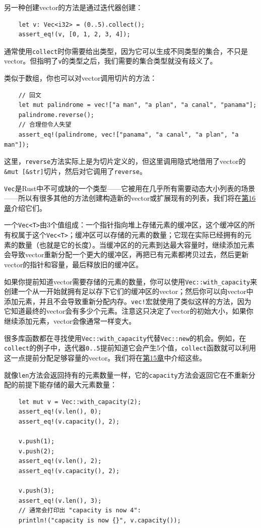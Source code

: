 另一种创建vector的方法是通过迭代器创建：
\begin{verbatim}
    let v: Vec<i32> = (0..5).collect();
    assert_eq!(v, [0, 1, 2, 3, 4]);
\end{verbatim}

通常使用\texttt{collect}时你需要给出类型，因为它可以生成不同类型的集合，不只是vector。但指明了\texttt{v}的类型之后，我们需要的集合类型就没有歧义了。

类似于数组，你也可以对vector调用切片的方法：
\begin{verbatim}
    // 回文
    let mut palindrome = vec!["a man", "a plan", "a canal", "panama"];
    palindrome.reverse();
    // 合理但令人失望
    assert_eq!(palindrome, vec!["panama", "a canal", "a plan", "a man"]);
\end{verbatim}

这里，\texttt{reverse}方法实际上是为切片定义的，但这里调用隐式地借用了vector的\texttt{\&mut [\&str]}切片，然后对它调用了\texttt{reverse}。

\texttt{Vec}是Rust中不可或缺的一个类型——它被用在几乎所有需要动态大小列表的场景——所以有很多其他的方法创建构造新的vector或扩展现有的列表，我们将在\hyperref[ch16]{第16章}介绍它们。

一个\texttt{Vec<T>}由3个值组成：一个指针指向堆上存储元素的缓冲区，这个缓冲区的所有权属于这个\texttt{Vec<T>}；缓冲区可以存储的元素的数量；它现在实际已经拥有的元素的数量（也就是它的长度）。当缓冲区的的元素到达最大容量时，继续添加元素会导致vector重新分配一个更大的缓冲区，再把已有元素都拷贝过去，然后更新vector的指针和容量，最后释放旧的缓冲区。

如果你提前知道vector需要存储的元素的数量，你可以使用\texttt{Vec::with\_capacity}来创建一个从一开始就拥有足以存下它们的缓冲区的vector；然后你可以向vector中添加元素，并且不会导致重新分配内存。\texttt{vec!}宏就使用了类似这样的方法，因为它知道最终的vector会有多少个元素。注意这只决定了vector的初始大小，如果你继续添加元素，vector会像通常一样变大。

很多库函数都在寻找使用\texttt{Vec::with\_capacity}代替\texttt{Vec::new}的机会。例如，在\texttt{collect}的例子中，迭代器\texttt{0..5}提前知道它会产生5个值，\texttt{collect}函数就可以利用这一点提前分配足够容量的vector。我们将在\hyperref[ch15]{第15章}中介绍这些。

就像\texttt{len}方法会返回持有的元素数量一样，它的\texttt{capacity}方法会返回它在不重新分配的前提下能存储的最大元素数量：
\begin{verbatim}
    let mut v = Vec::with_capacity(2);
    assert_eq!(v.len(), 0);
    assert_eq!(v.capacity(), 2);

    v.push(1);
    v.push(2);
    assert_eq!(v.len(), 2);
    assert_eq!(v.capacity(), 2);

    v.push(3);
    assert_eq!(v.len(), 3);
    // 通常会打印出 "capacity is now 4":
    println!("capacity is now {}", v.capacity());
\end{verbatim}

